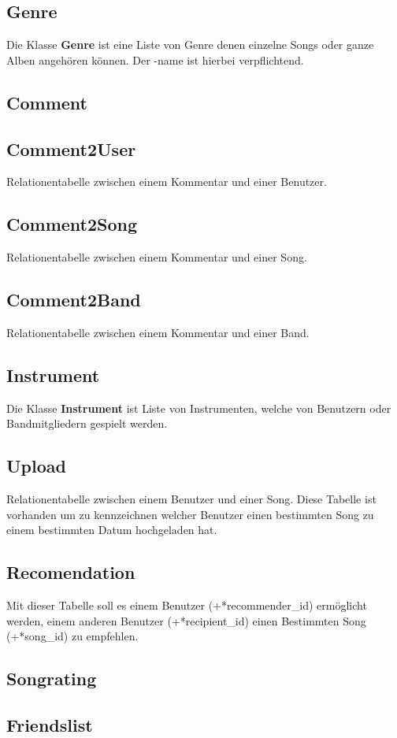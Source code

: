 \documentclass[11pt,a4paper,DIV=9]{scrartcl}
\begin{document}
  \subsection{Genre}
    Die Klasse \textbf{Genre} ist eine Liste von Genre denen einzelne Songs oder ganze Alben angehören können. Der -name ist hierbei verpflichtend.
  \subsection{Comment}
  \subsection{Comment2User}
    Relationentabelle zwischen einem Kommentar und einer Benutzer.
  \subsection{Comment2Song}
    Relationentabelle zwischen einem Kommentar und einer Song.
  \subsection{Comment2Band}
    Relationentabelle zwischen einem Kommentar und einer Band.
  \subsection{Instrument}
    Die Klasse \textbf{Instrument} ist Liste von Instrumenten, welche von Benutzern oder Bandmitgliedern gespielt werden.
  \subsection{Upload}
    Relationentabelle zwischen einem Benutzer und einer Song. Diese Tabelle ist vorhanden um zu kennzeichnen welcher Benutzer einen bestimmten Song zu einem bestimmten Datum hochgeladen hat.
  \subsection{Recomendation}
    Mit dieser Tabelle soll es einem Benutzer (+*recommender\_id) ermöglicht werden, einem anderen Benutzer (+*recipient\_id) einen Bestimmten Song (+*song\_id) zu empfehlen.
  \subsection{Songrating}
  \subsection{Friendslist}
\end{document}
